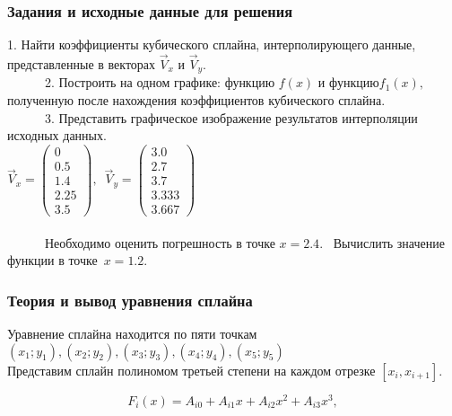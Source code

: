 \documentclass[russian,utf8,nocolumnxxxi,nocolumnxxxii]{eskdtext}
\begin{document}
{      \subsubsection{Задания и исходные данные для решения} 
      $ $1. Найти коэффициенты кубического сплайна, интерполирующего данные, представленные в векторах$\,\,  {\vec{V}_x} \,\,$и$\,\, {\vec{V}_y.}$ \\
      $ {\,\,\,\,\,\,\,\,\,\,\,\,\,\,\,\,\,\,}$2. Построить на одном графике: функцию$\,\, {f(x)}\,\, $и$\,\,  функцию {f_1(x)}, $полученную после нахождения коэффициентов кубического сплайна.$ $ \\
      $ {\,\,\,\,\,\,\,\,\,\,\,\,\,\,\,\,\,\,}$3. Представить графическое изображение результатов интерполяции исходных данных$ $.\\
                       
      $\vec{V}_x=\left(\begin{array}{c}0\\0.5\\1.4\\2.25\\3.5\end{array}\right),
      \,\,\,\vec{V}_y=\left(\begin{array}{c}3.0\\2.7\\3.7\\3.333\\3.667\end{array}\right)$ \\\\
      $ {\,\,\,\,\,\,\,\,\,\,\,\,\,\,\,\,\,\,}$Необходимо оценить погрешность в точке $ {x = 2.4}. $\,\,\,\,\,Вычислить значение функции в точке $\,{x = 1.2}.$\\
      \newpage
      \newpage
      \subsubsection{Теория и вывод уравнения сплайна}
      Уравнение сплайна находится по пяти точкам\\
      $(x_1;y_1), (x_2;y_2), (x_3;y_3), (x_4;y_4), (x_5;y_5)$\\
      Представим сплайн полиномом третьей степени на каждом отрезке
      $[x_i, x_{i+1}]$.
      
      \begin{equation}\label{eq:F_i(x)}
      F_i(x)=A_{i0}+{A_{i1}}x+{A_{i2}}x^2+{A_{i3}}x^3,
      \end{equation}
      
}
\end{document}
